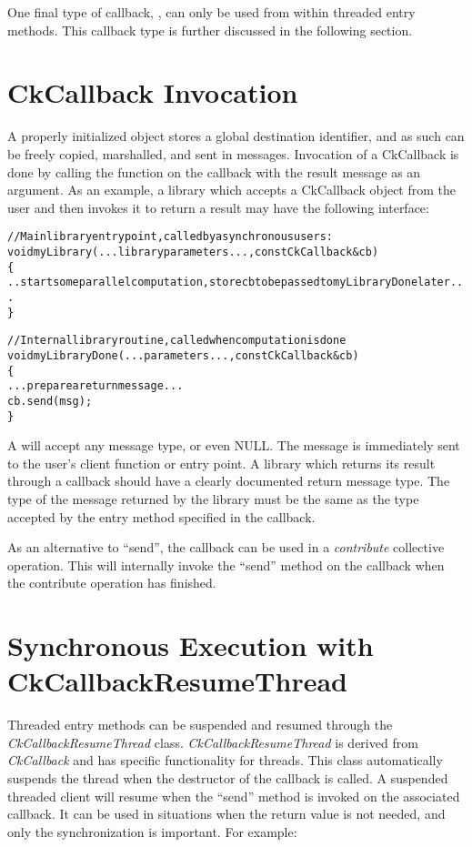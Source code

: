 One final type of callback, , 
can only be used from within threaded entry methods. 
This callback type is further discussed in the following section.

\section{CkCallback Invocation}

\label{libraryInterface}

A properly initialized  object stores a global
destination identifier, and as such can be freely copied, marshalled,
and sent in messages. Invocation of a CkCallback is done by calling
the function  on the callback with the result message as an
argument. As an example, a library which accepts a CkCallback object
from the user and then invokes it to return a result may have the
following interface:

\begin{alltt}
//Main library entry point, called by asynchronous users:
void myLibrary(...library parameters...,const CkCallback \&cb) 
\{
  ..start some parallel computation, store cb to be passed to myLibraryDone later...
\}

//Internal library routine, called when computation is done
void myLibraryDone(...parameters...,const CkCallback \&cb)
\{
  ...prepare a return message...
  cb.send(msg);
\}
\end{alltt}

A  will accept any message type, or even NULL.  The
message is immediately sent to the user's client function or entry
point.  A library which returns its result through a callback should
have a clearly documented return message type. The type of the message
returned by the library must be the same as the type accepted by the
entry method specified in the callback. 

As an alternative to ``send'', the callback can be used in a {\em
  contribute} collective operation. This will internally invoke the
``send'' method on the callback when the contribute operation has
finished.

\section{Synchronous Execution with CkCallbackResumeThread}

Threaded entry methods can be suspended and resumed through the {\em
  CkCallbackResumeThread} class. {\em CkCallbackResumeThread} is
derived from {\em CkCallback} and has specific functionality for
threads.  This class automatically suspends the thread when the
destructor of the callback is called.  A suspended threaded client
will resume when the ``send'' method is invoked on the associated
callback.  It can be used in situations when the return value is not
needed, and only the synchronization is important. For example:

